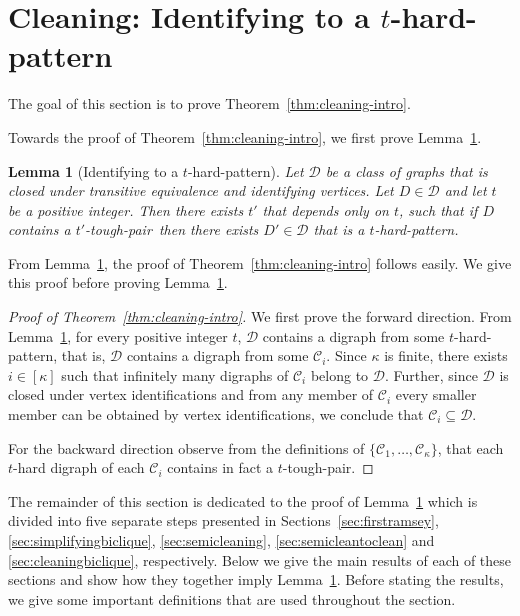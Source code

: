 \documentclass[a4paper,11pt]{article}
\theoremstyle{plain}
\newtheorem{lemma}[theorem]{Lemma}
\newtheorem{identification rule}{Identification Rule}
\theoremstyle{definition}
\theoremstyle{remark}
\newcommand{\toughpair}{tough-pair}
\newcommand{\hardpattern}[1]{$#1$-hard-pattern}
\begin{document}
\section{Cleaning: Identifying to a \hardpattern{t}}\label{sec:cleaning}

The goal of this section is to prove Theorem~\ref{thm:cleaning-intro}.

\cleaning*

Towards the proof of Theorem~\ref{thm:cleaning-intro}, we first prove Lemma~\ref{lem:cleaning-wrap-up}. 

\begin{lemma}[Identifying to a \hardpattern{t}]\label{lem:cleaning-wrap-up}
Let $\mathcal{D}$ be a class of graphs that is closed under transitive equivalence and identifying vertices. Let $D \in \mathcal{D}$ and let $t$ be a positive integer. 
Then there exists $t'$ that depends only on $t$,
such that if $D$ contains a $t'$-\toughpair\ then there exists $D' \in \mathcal{D}$ that is a \hardpattern{t}.
\end{lemma}

From Lemma~\ref{lem:cleaning-wrap-up}, the proof of Theorem~\ref{thm:cleaning-intro} follows easily. We give this proof before proving Lemma~\ref{lem:cleaning-wrap-up}.

\begin{proof}[Proof of Theorem~\ref{thm:cleaning-intro}]

We first prove the forward direction.
From Lemma~\ref{lem:cleaning-wrap-up}, for every positive integer $t$, $\mathcal{D}$ contains a digraph from some \hardpattern{t}, that is, $\mathcal{D}$ contains a digraph from some $\mathcal{C}_i$. Since $\kappa$ is finite, 
there exists $i \in [\kappa]$ such that infinitely many 
digraphs of $\mathcal{C}_i$ belong to $\mathcal{D}$. Further, since $\mathcal{D}$ is closed under vertex identifications and from any member of $\mathcal{C}_i$ every smaller member can be obtained by vertex identifications, we conclude that $\mathcal{C}_i \subseteq \mathcal{D}$.

For the backward direction observe from the definitions of $\{ \mathcal{C}_1, \ldots ,\mathcal{C}_{\kappa}\}$, that each $t$-hard digraph of each $\mathcal{C}_i$ contains in fact a $t$-\toughpair.
\end{proof}

The remainder of this section is dedicated to the proof of Lemma~\ref{lem:cleaning-wrap-up} which is divided into five separate steps presented in Sections~\ref{sec:firstramsey}, \ref{sec:simplifyingbiclique}, \ref{sec:semicleaning}, \ref{sec:semicleantoclean} and \ref{sec:cleaningbiclique}, respectively. Below we give the main results of each of these sections and show how they together imply Lemma~\ref{lem:cleaning-wrap-up}. Before stating the results, we give some important definitions that are used throughout the section.
\end{document}

